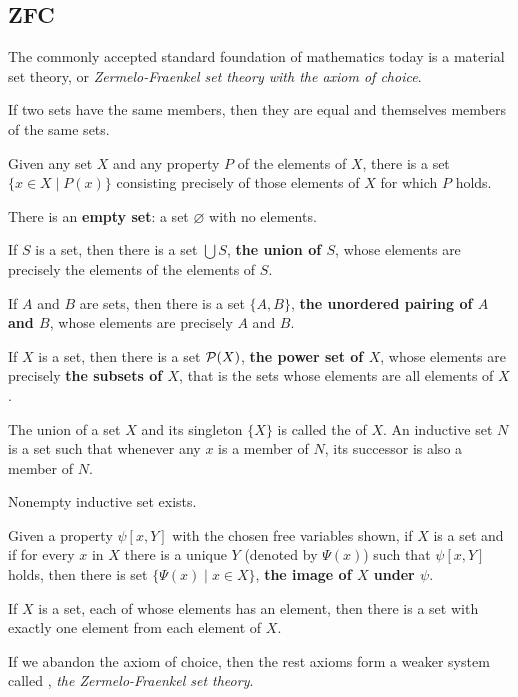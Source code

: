 \subsection{ZFC}
  The commonly accepted standard foundation of mathematics today is a material set theory,  or \emph{Zermelo-Fraenkel set theory with the axiom of choice}.
  \begin{axiom}[Extensionality]
    If two sets have the same members, then they are equal and themselves members of the same sets.
  \end{axiom}
  \begin{axiom}[Specification]
    Given any set $X$ and any property $P$ of the elements of $X$, there is a set $\{x\in X\mid P(x)\}$ consisting precisely of those elements of $X$ for which $P$ holds.
  \end{axiom}
  \begin{axiom}
    There is an \textbf{empty set}: a set $\varnothing$ with no elements.
  \end{axiom}
  \begin{axiom}[Union]
    If $S$ is a set, then there is a set $\bigcup S$, \textbf{the union of $S$}, whose elements are precisely the elements of the elements of $S$.
  \end{axiom}
  \begin{axiom}[Paring]
    If $A$ and $B$ are sets, then there is a set $\{A,B\}$, \textbf{the unordered pairing of $A$ and $B$}, whose elements are precisely $A$ and $B$.
  \end{axiom}
  \begin{axiom}
    If $X$ is a set, then there is a set ${\cal P}(X)$, \textbf{the power set of $X$}, whose elements are precisely \textbf{the subsets of $X$}, that is the sets whose elements are all elements of $X$.
  \end{axiom}
  \begin{defn}
    The union of a set $X$ and its singleton $\{X\}$ is called the  of $X$. An inductive set $N$ is a set such that whenever any $x$ is a member of $N$, its successor is also a member of $N$.
  \end{defn}
  \begin{axiom}[Infinity]
    Nonempty inductive set exists.
  \end{axiom}
  \begin{axiom}[Replacement]
    Given a property $\psi[x,Y]$ with the chosen free variables shown, if $X$ is a set and if for every $x$ in $X$ there is a unique $Y$ (denoted by $\Psi(x)$) such that $\psi[x,Y]$ holds, then there is set $\{\Psi(x)\mid x\in X\}$, \textbf{the image of $X$ under $\psi$}.
  \end{axiom}
  \begin{axiom}[Choice]
    If $X$ is a set, each of whose elements has an element, then there is a set with exactly one element from each element of $X$.
  \end{axiom}
  If we abandon the axiom of choice, then the rest axioms form a weaker system called , \emph{the Zermelo-Fraenkel set theory}.

